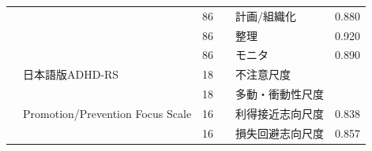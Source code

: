 \begin{landscape}
\begin{longtable}{p{2cm}p{2cm}p{2cm}p{6cm}p{2cm}p{2cm}}
                                 &                                  & 86  &                                                     & 計画/組織化               & 0.880   \\
                                 &                                  & 86  &                                                     & 整理                   & 0.920   \\
                                 &                                  & 86  &                                                     & モニタ                  & 0.890   \\
                                 & 日本語版ADHD-RS                      & 18  &                                                     & 不注意尺度                &         \\
                                 &                                  & 18  &                                                     & 多動・衝動性尺度             &         \\
        \citet{Li202292}         & Promotion/Prevention Focus Scale & 16  &                                                     & 利得接近志向尺度             & 0.838   \\
                                 &                                  & 16  &                                                     & 損失回避志向尺度             & 0.857   \\ \hline
    \end{longtable}
\end{landscape}
